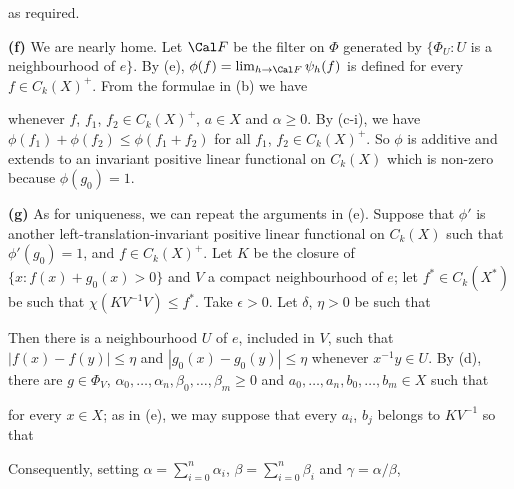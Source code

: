 {\noindent as required.\ \Qed

\medskip

{\bf (f)} We are nearly home.   Let $\Cal F$ be the filter on $\Phi$
generated by $\{\Phi_U:U$ is a neighbourhood of $e\}$.   By (e),
$\phi(f)=\lim_{h\to\Cal F}\psi_h(f)$ is defined for every $f\in C_k(X)^+$.
From the formulae in (b) we have


\noindent whenever $f$,
$f_1$, $f_2\in C_k(X)^+$, $a\in X$ and $\alpha\ge 0$.
By (c-i), we have $\phi(f_1)+\phi(f_2)\le\phi(f_1+f_2)$ for all $f_1$,
$f_2\in C_k(X)^+$.   So $\phi$ is additive and extends to an invariant
positive linear functional on $C_k(X)$ which is non-zero because
$\phi(g_0)=1$.

\medskip

{\bf (g)} As for uniqueness, we can repeat the arguments in (e).
Suppose that $\phi'$ is another
left-translation-invariant positive linear functional on $C_k(X)$ such that
$\phi'(g_0)=1$, and $f\in C_k(X)^+$.   Let
$K$ be the closure of ${\{x:f(x)+g_0(x)>0\}}$ and $V$ a compact
neighbourhood
of $e$;  let $f^*\in C_k(X^*)$ be such that $\chi(KV^{-1}V)\le f^*$.
Take $\epsilon>0$.   Let $\delta$, $\eta>0$ be such that



\noindent Then there
is a neighbourhood $U$ of $e$, included in $V$, such that
$|f(x)-f(y)|\le\eta$
and $|g_0(x)-g_0(y)|\le\eta$ whenever $x^{-1}y\in U$.   By (d),
there are $g\in\Phi_V$,
$\alpha_0,\ldots,\alpha_n,\beta_0,\ldots,\beta_m\ge 0$ and
$a_0,\ldots,a_n,b_0,\ldots,b_m\in X$ such that


\noindent for every $x\in X$;  as in (e), we may suppose that every $a_i$,
$b_j$ belongs to $KV^{-1}$ so that


\noindent Consequently, setting $\alpha=\sum_{i=0}^n\alpha_i$,
$\beta=\sum_{i=0}^n\beta_i$ and $\gamma=\alpha/\beta$,

}
